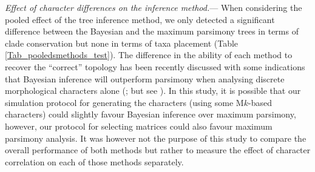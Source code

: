 \documentclass[12pt,letterpaper]{article}
\renewcommand{\subsubsection}[1]{%
\vspace{2ex}
\noindent
\textit{#1.}---}
\begin{document}
\subsubsection{Effect of character differences on the inference method}
When considering the pooled effect of the tree inference method, we only detected a significant difference between the Bayesian and the maximum parsimony trees in terms of clade conservation but none in terms of taxa placement (Table \ref{Tab_pooledsmethods_test}).
The difference in the ability of each method to recover the ``correct'' topology has been recently discussed with some indications that Bayesian inference will outperform parsimony when analysing discrete morphological characters alone (\citealt{wrightbayesian2014,OReilly20160081,puttick2017uncertain}; but see \citealt{spencerefficacy2013,goloboff2017weighted}).
In this study, it is possible that our simulation protocol for generating the characters (using some M$k$-based characters) could slightly favour Bayesian inference over maximum parsimony, however, our protocol for selecting matrices \citep[using matrices with a $CI>0.26$;][]{OReilly20160081} could also favour maximum parsimony analysis.
It was however not the purpose of this study to compare the overall performance of both methods but rather to measure the effect of character correlation on each of those methods separately. %

\end{document}
